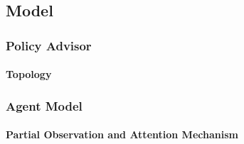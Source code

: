 \documentclass{article}
\begin{document}
	    \subsection{Model}

            \subsubsection{Policy Advisor}

                \paragraph{Topology}



	        \subsubsection{Agent Model}

                \paragraph{Partial Observation and Attention Mechanism}
\end{document}
